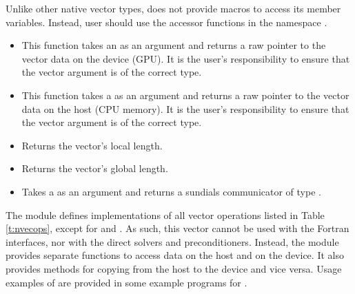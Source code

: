 Unlike other native {\sundials} vector types, {\nveccuda} does not provide macros
to access its member variables. Instead, user should use the accessor functions in
the namespace .
\begin{itemize}

\item

  This function takes an  as an argument and returns a raw pointer to the vector
  data on the device (GPU). It is the user's responsibility to ensure that the vector argument 
  is of the correct  type.

\item

  This function takes a  as an argument and returns a raw pointer to the vector
  data on the host (CPU memory). It is the user's responsibility to ensure that the vector argument 
  is of the correct  type.

\item {}

  Returns the vector's local length.


\item {}

  Returns the vector's global length.


\item {}

  Takes a  as an argument and returns a sundials communicator of type
  .

\end{itemize}


The {\nveccuda} module defines implementations of all vector operations listed
in Table \ref{t:nvecops}, except for  and .
As such, this vector cannot be used with the {\sundials} Fortran interfaces,
nor with the {\sundials} direct solvers and preconditioners. Instead,
the {\nveccuda} module provides separate functions to access data on the host
and on the device. It also provides methods for copying from the host to
the device and vice versa. Usage examples of {\nveccuda} are provided in
some example programs for {\cvode} \cite{cvode_ex}.

